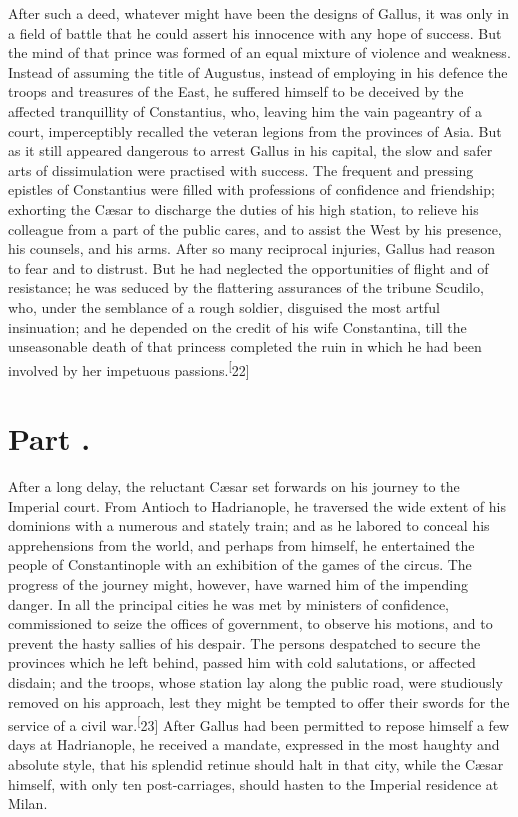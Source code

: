 After such a deed, whatever might have been the designs of
Gallus, it was only in a field of battle that he could assert his
innocence with any hope of success. But the mind of that prince
was formed of an equal mixture of violence and weakness. Instead
of assuming the title of Augustus, instead of employing in his
defence the troops and treasures of the East, he suffered himself
to be deceived by the affected tranquillity of Constantius, who,
leaving him the vain pageantry of a court, imperceptibly recalled
the veteran legions from the provinces of Asia. But as it still
appeared dangerous to arrest Gallus in his capital, the slow and
safer arts of dissimulation were practised with success. The
frequent and pressing epistles of Constantius were filled with
professions of confidence and friendship; exhorting the Cæsar to
discharge the duties of his high station, to relieve his
colleague from a part of the public cares, and to assist the West
by his presence, his counsels, and his arms. After so many
reciprocal injuries, Gallus had reason to fear and to distrust.
But he had neglected the opportunities of flight and of
resistance; he was seduced by the flattering assurances of the
tribune Scudilo, who, under the semblance of a rough soldier,
disguised the most artful insinuation; and he depended on the
credit of his wife Constantina, till the unseasonable death of
that princess completed the ruin in which he had been involved by
her impetuous passions.\textsuperscript[22]


\section{Part \thesection.}

After a long delay, the reluctant Cæsar set forwards on his
journey to the Imperial court. From Antioch to Hadrianople, he
traversed the wide extent of his dominions with a numerous and
stately train; and as he labored to conceal his apprehensions
from the world, and perhaps from himself, he entertained the
people of Constantinople with an exhibition of the games of the
circus. The progress of the journey might, however, have warned
him of the impending danger. In all the principal cities he was
met by ministers of confidence, commissioned to seize the offices
of government, to observe his motions, and to prevent the hasty
sallies of his despair. The persons despatched to secure the
provinces which he left behind, passed him with cold salutations,
or affected disdain; and the troops, whose station lay along the
public road, were studiously removed on his approach, lest they
might be tempted to offer their swords for the service of a civil
war.\textsuperscript[23] After Gallus had been permitted to repose himself a few
days at Hadrianople, he received a mandate, expressed in the most
haughty and absolute style, that his splendid retinue should halt
in that city, while the Cæsar himself, with only ten
post-carriages, should hasten to the Imperial residence at Milan.

